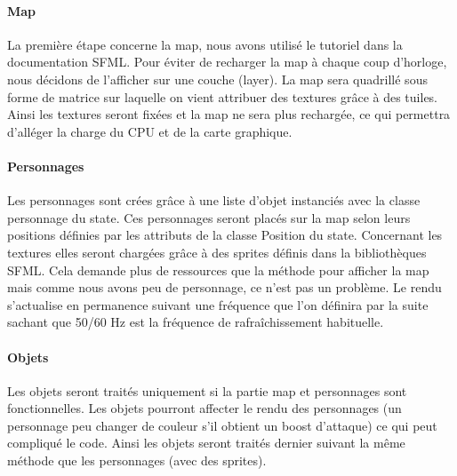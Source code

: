 \documentclass[a4paper,12pt]{article}
\begin{document}
\paragraph{Map}
La première étape concerne la map, nous avons utilisé le tutoriel dans la documentation SFML. Pour éviter de recharger la map à chaque coup d'horloge, nous décidons de l'afficher sur une couche (layer). La map sera quadrillé sous forme de matrice sur laquelle on vient attribuer des textures grâce à des tuiles. Ainsi les textures seront fixées et la map ne sera plus rechargée, ce qui permettra d'alléger la charge du CPU et de la carte graphique.\\
\paragraph{Personnages}
Les personnages sont crées grâce à une liste d'objet instanciés avec la classe personnage du state. Ces personnages seront placés sur la map selon leurs positions définies par les attributs de la classe Position du state. Concernant les textures elles seront chargées grâce à des sprites définis dans la bibliothèques SFML. Cela demande plus de ressources que la méthode pour afficher la map mais comme nous avons peu de personnage, ce n'est pas un problème. Le rendu s'actualise en permanence suivant une fréquence que l'on définira par la suite sachant que 50/60 Hz est la fréquence de rafraîchissement habituelle.

\paragraph{Objets}
Les objets seront traités uniquement si la partie map et personnages sont fonctionnelles. Les objets pourront affecter le rendu des personnages (un personnage peu changer de couleur s'il obtient un boost d'attaque) ce qui peut compliqué le code. Ainsi les objets seront traités dernier suivant la même méthode que les personnages (avec des sprites).
\end{document}
